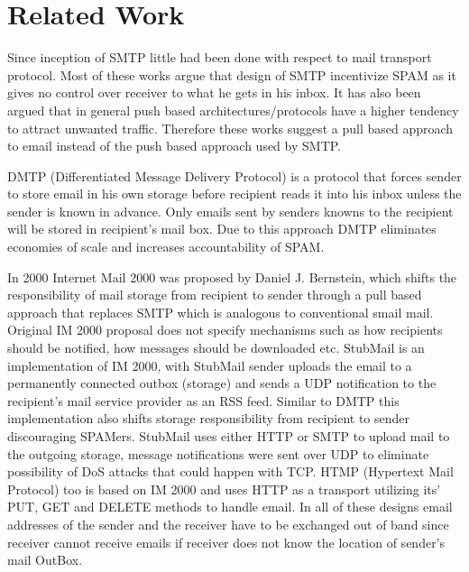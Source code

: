 \section{Related Work}

Since inception of SMTP little had been done with respect to mail transport
protocol. Most of these works argue that design of SMTP incentivize SPAM as it
gives no control over receiver to what he gets in his inbox. It has also been
argued that in general push based architectures/protocols have a higher tendency
to attract unwanted traffic\cite{PushVsPull}. Therefore these works suggest a
pull based approach to email instead of the push based approach used by SMTP. 

DMTP (Differentiated Message Delivery Protocol) \cite{dtmp} is a protocol that
forces sender to store email in his own storage before recipient reads it into
his inbox unless the sender is known in advance. Only emails sent by senders
knowns to the recipient will be stored in recipient's mail box. Due to this
approach DMTP eliminates economies of scale and increases accountability of
SPAM.

In 2000 Internet Mail 2000 \cite{im2k} was proposed by Daniel J. Bernstein,
which shifts the responsibility of mail storage from recipient to sender through
a pull based approach that replaces SMTP which is analogous to conventional
smail mail. Original IM 2000 proposal does not specify mechanisms such as how
recipients should be notified, how messages should be downloaded etc. StubMail
\cite{stubmail} is an implementation of IM 2000, with StubMail sender uploads
the email to a permanently connected outbox (storage) and sends a UDP
notification to the recipient’s mail service provider as an RSS feed. Similar to
DMTP this implementation also shifts storage responsibility from recipient to
sender discouraging SPAMers. StubMail uses either HTTP \cite{HTTP-RFC} or 
SMTP\cite{SMTP-RFC} to upload mail to the outgoing storage, message notifications 
were sent over UDP to eliminate possibility of DoS attacks that could happen with 
TCP. HTMP (Hypertext Mail Protocol)\cite{htmp} too is based on IM 2000 and uses 
HTTP as a transport utilizing its’ PUT, GET and DELETE methods to handle email. 
In all of these designs email addresses of the sender and the receiver have to be 
exchanged out of band since receiver cannot receive emails if receiver does not 
know the location of sender’s mail OutBox.

